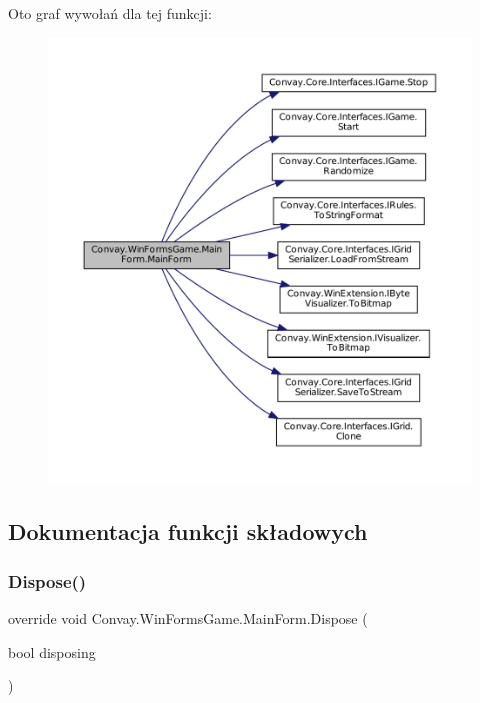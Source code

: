 Oto graf wywołań dla tej funkcji\+:
\nopagebreak
\begin{figure}[H]
\begin{center}
\leavevmode
\includegraphics[width=350pt]{class_convay_1_1_win_forms_game_1_1_main_form_a777eb51af380321826a26ac3dacfcda0_cgraph}
\end{center}
\end{figure}


\subsection{Dokumentacja funkcji składowych}
\hypertarget{class_convay_1_1_win_forms_game_1_1_main_form_aa1405c65b2a14ad43edd6ae76537531b}{}\label{class_convay_1_1_win_forms_game_1_1_main_form_aa1405c65b2a14ad43edd6ae76537531b} 
\subsubsection{\texorpdfstring{Dispose()}{Dispose()}}
{\footnotesize\ttfamily override void Convay.\+Win\+Forms\+Game.\+Main\+Form.\+Dispose (\begin{DoxyParamCaption}\item[{bool}]{disposing }\end{DoxyParamCaption})\hspace{0.3cm}{\ttfamily [protected]}}



